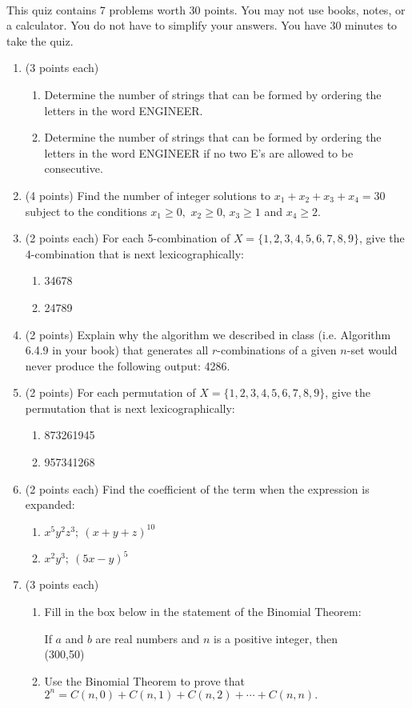 \documentclass[12pt]{article}
\newcommand{\be}{\begin{enumerate}}
\newcommand{\ee}{\end{enumerate}}
\begin{document}
\thispagestyle{fancy}


\\

\noindent This quiz contains 7 problems worth 30 points. You may not use books, notes, or a calculator. You do not have to simplify your answers. You have 30 minutes to take the quiz.\\

\noindent\hrulefill

\be
\item (3 points each)
\be
\item Determine the  number of strings that can be formed by ordering the letters in the word ENGINEER.
\vfill
\item Determine the  number of strings that can be formed by ordering the letters in the word ENGINEER if no two E's are allowed to be consecutive.
\vfill
\ee
\item (4 points) Find the number of integer solutions to $x_1+x_2+x_3+x_4 = 30$ subject to the conditions $x_1 \geq 0,$ $x_2 \geq 0$, $x_3 \geq 1$ and $x_4 \geq 2.$\\
\vfill
\item (2 points each) For each 5-combination of $X=\{1,2,3,4,5,6,7,8,9\}$, give the 4-combination that is next lexicographically:
\be
\item 34678
\vfill
\item 24789
\vfill
\ee
\item (2 points) Explain why the algorithm we described in class (i.e. Algorithm 6.4.9 in your book) that generates all $r$-combinations of a given $n$-set would never produce the following output: 4286.
\vfill 
\newpage
\item (2 points) For each permutation of $X=\{1,2,3,4,5,6,7,8,9\}$, give the permutation that is next lexicographically:
\be
\item 873261945
\vfill
\item 957341268
\vfill
\ee
\item (2 points each) Find the coefficient of the term when the expression is expanded:
\be
\item $x^5y^2z^3;\: (x+y+z)^{10}$ \vfill
\item $x^2y^3;\:(5x-y)^5$ \vfill
\ee
\item (3 points each)
\be 
\item Fill in the box below in the statement of the Binomial Theorem:\\
\begin{center} If $a$ and $b$ are real numbers and $n$ is a positive integer, then \\ \framebox(300,50){} \end{center}
\item Use the Binomial Theorem to prove that $2^n=C(n,0)+C(n,1)+C(n,2)+ \cdots + C(n,n).$
\vspace{2in}
\ee
\ee
\end{document}
